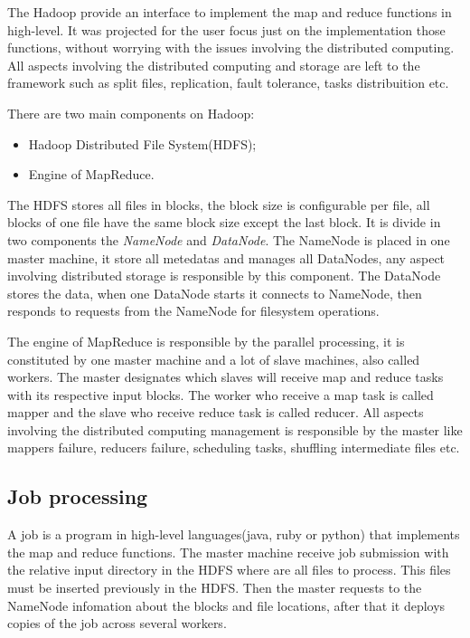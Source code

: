 The Hadoop provide an interface to implement the map and reduce functions in high-level.
It was projected for the user focus just on the implementation those functions,
without worrying with the issues involving the distributed computing. All aspects
involving the distributed computing and storage are left to the framework such as
split files, replication, fault tolerance, tasks distribuition etc.

There are two main components on Hadoop:
\begin{itemize}
	\item Hadoop Distributed File System(HDFS);
	\item Engine of MapReduce.
\end{itemize}

The HDFS stores all files in blocks, the block size is configurable per file, all
blocks of one file have the same block size except the last block. It is divide
in two components the \textit{NameNode} and \textit{DataNode}. The NameNode is placed
in one master machine, it store all metedatas and manages all DataNodes, any aspect
involving distributed storage is responsible by this component. The DataNode stores
the data, when one DataNode starts it connects to NameNode, then responds to requests
from the NameNode for filesystem operations.

The engine of MapReduce is responsible by the parallel processing, it is constituted
by one master machine and a lot of slave machines, also called workers. The master
designates which slaves will receive map and reduce tasks with its respective input
blocks. The worker who receive a map task is called mapper and the slave who receive
reduce task is called reducer. All aspects involving the distributed computing
management is responsible by the master like mappers failure, reducers failure,
scheduling tasks, shuffling intermediate files etc.

\subsection{Job processing}

A job is a program in high-level languages(java, ruby or python) that implements the
map and reduce functions. The master machine receive job submission with the relative
input directory in the HDFS where are all files to process. This files must be
inserted previously in the HDFS. Then the master requests to the NameNode infomation
about the blocks and file locations, after that it deploys copies of the job across
several workers.

